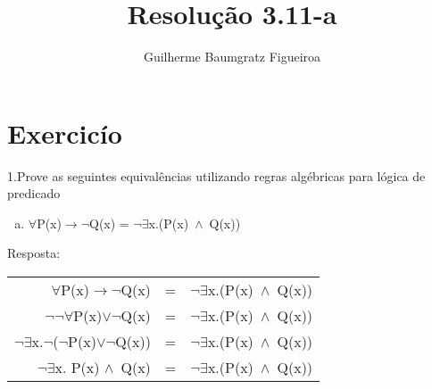 \documentclass[aspectratio=43]{beamer}
\title[\sc{Resolu\c c\~ao}]{Resolu\c c\~ao 3.11-a}
\author[Guilherme Baumgratz Figueiroa]{Guilherme Baumgratz Figueiroa}
\institute[UFOP]{Universidade Federal de Ouro Preto} %
\date{}
\newcommand{\ria}{$\rightarrow$}
\newcommand{\fall}{$\forall$}
\newcommand{\ex}{$\exists$}
\newcommand{\nao}{$\neg$}
\newcommand{\nex}{\nao\ex}
\newcommand{\andd}{$\wedge$}
\newcommand{\orr}{$\vee$}
\begin{document}
	
\begin{frame}
	\titlepage
\end{frame}

\section{Exercic\'io}

\begin{frame}%
	1.Prove as seguintes equival\^encias utilizando regras alg\'ebricas para l\'ogica de predicado
	\begin{enumerate}[a)]
		
		\item \fall P(x)\ria\nao Q(x) = \nex x.(P(x)\ \andd\ Q(x)) \\
		
	\end{enumerate}
	
	Resposta:
	\\
	\centering
	\pause
	
	\begin{tabular}{rcl}
		\fall P(x)\ria\nao Q(x) & = & \nex x.(P(x)\ \andd\ Q(x))\\
		\pause
		\nao \nao \fall P(x)\orr\nao Q(x) & = & \nex x.(P(x)\ \andd\ Q(x)) \\
		\pause
		\nex x.\nao (\nao P(x)\orr\nao Q(x)) & = & \nex x.(P(x)\ \andd\ Q(x)) \\
		\pause
		\nex x. P(x) \andd\ Q(x) & = & \nex x.(P(x)\ \andd\ Q(x)) 
	\end{tabular}
	
	
\end{frame}
\end{document}
